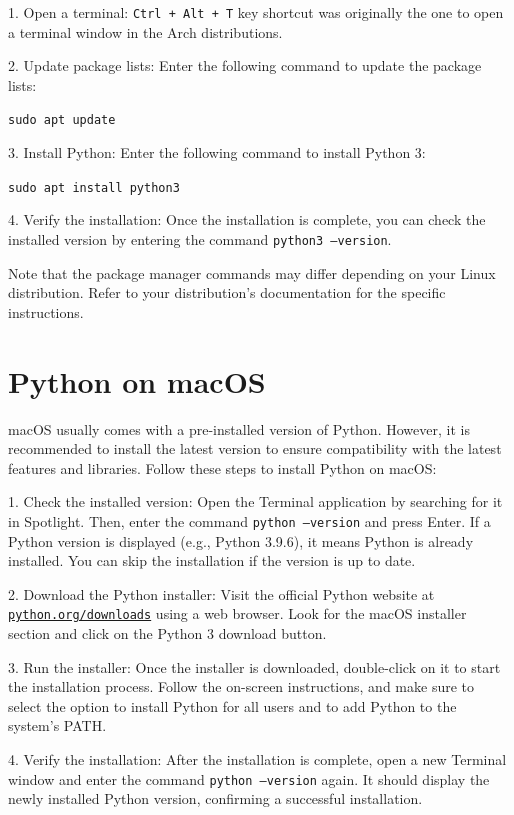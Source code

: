 \documentclass[12pt]{book}
\begin{document}
1. Open a terminal: \texttt{Ctrl + Alt + T} key shortcut was originally the one to open a terminal window in the Arch distributions.

2. Update package lists: Enter the following command to update the package lists:

   \texttt{sudo apt update}

3. Install Python: Enter the following command to install Python 3:

   \texttt{sudo apt install python3}

4. Verify the installation: Once the installation is complete, you can check the installed version by entering the command \texttt{python3 --version}.

Note that the package manager commands may differ depending on your Linux distribution. Refer to your distribution's documentation for the specific instructions.

\section{Python on macOS}

macOS usually comes with a pre-installed version of Python. However, it is recommended to install the latest version to ensure compatibility with the latest features and libraries. Follow these steps to install Python on macOS:

1. Check the installed version: Open the Terminal application by searching for it in Spotlight. Then, enter the command \texttt{python --version} and press Enter. If a Python version is displayed (e.g., Python 3.9.6), it means Python is already installed. You can skip the installation if the version is up to date.

2. Download the Python installer: Visit the official Python website at
 \texttt{{\href{https://www.python.org/downloads}{python.org/downloads}}} using a web browser. Look for the macOS installer section and click on the Python 3 download button.

3. Run the installer: Once the installer is downloaded, double-click on it to start the installation process. Follow the on-screen instructions, and make sure to select the option to install Python for all users and to add Python to the system's PATH.

4. Verify the installation: After the installation is complete, open a new Terminal window and enter the command \texttt{python --version} again. It should display the newly installed Python version, confirming a successful installation.
\end{document}
